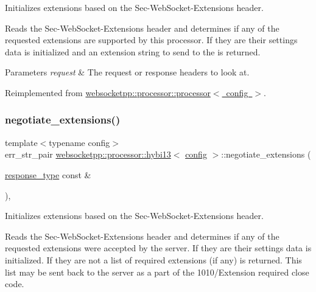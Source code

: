 Initializes extensions based on the Sec-\/\+Web\+Socket-\/\+Extensions header. 

Reads the Sec-\/\+Web\+Socket-\/\+Extensions header and determines if any of the requested extensions are supported by this processor. If they are their settings data is initialized and an extension string to send to the is returned.


\begin{DoxyParams}{Parameters}
{\em request} & The request or response headers to look at. \\
\hline
\end{DoxyParams}


Reimplemented from \mbox{\hyperlink{classwebsocketpp_1_1processor_1_1processor_aad69873505ba59f4ddf53e864f32bb80}{websocketpp\+::processor\+::processor$<$ config $>$}}.

\mbox{\label{classwebsocketpp_1_1processor_1_1hybi13_a5b01c6303142aa151cf9bf1fe9ccb6e3}} 
\subsubsection{\texorpdfstring{negotiate\+\_\+extensions()}{negotiate\_extensions()}\hspace{0.1cm}{\footnotesize\ttfamily [2/2]}}
{\footnotesize\ttfamily template$<$typename config$>$ \\
err\+\_\+str\+\_\+pair \mbox{\hyperlink{classwebsocketpp_1_1processor_1_1hybi13}{websocketpp\+::processor\+::hybi13}}$<$ \mbox{\hyperlink{classconfig}{config}} $>$\+::negotiate\+\_\+extensions (\begin{DoxyParamCaption}\item[{\mbox{\hyperlink{classwebsocketpp_1_1http_1_1parser_1_1response}{response\+\_\+type}} const \&}]{ }\end{DoxyParamCaption})\hspace{0.3cm}{\ttfamily [inline]}, {\ttfamily [virtual]}}



Initializes extensions based on the Sec-\/\+Web\+Socket-\/\+Extensions header. 

Reads the Sec-\/\+Web\+Socket-\/\+Extensions header and determines if any of the requested extensions were accepted by the server. If they are their settings data is initialized. If they are not a list of required extensions (if any) is returned. This list may be sent back to the server as a part of the 1010/\+Extension required close code.



